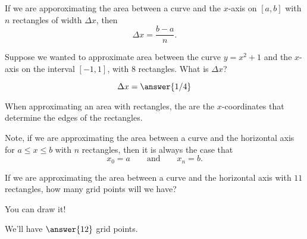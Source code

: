 \documentclass{ximera}
\begin{document}
\begin{definition}
  If we are apporoximating the area between a curve and the $x$-axis
  on $[a,b]$ with $n$ rectangles of width $\Delta x$, then
  \[
  \Delta x = \frac{b-a}{n}.
  \]
\end{definition}

\begin{question}
  Suppose we wanted to approximate area between the curve $y=x^2+1$
  and the $x$-axis on the interval $[-1,1]$, with $8$ rectangles. What is $\Delta x$?
  \begin{prompt}
    \[
    \Delta x = \answer{1/4}
    \]
  \end{prompt}
\end{question}

\begin{definition}
  When approximating an area with rectangles, the 
  are the $x$-coordinates that determine the edges of the rectangles.
\begin{image}
\end{image}
Note, if we are approximating the area between a curve and the
horizontal axis for $a\le x\le b$ with $n$ rectangles, then it is
always the case that
\[
x_0=a\qquad\text{and}\qquad x_n = b.
\]
\end{definition}

\begin{question}
  If we are approximating the area between a curve and the horizontal
  axis with $11$ rectangles, how many grid points will we have?
  \begin{hint}
    You can draw it!
  \end{hint}
  \begin{prompt}
    We'll have $\answer{12}$ grid points.
  \end{prompt}
\end{question}
\end{document}
